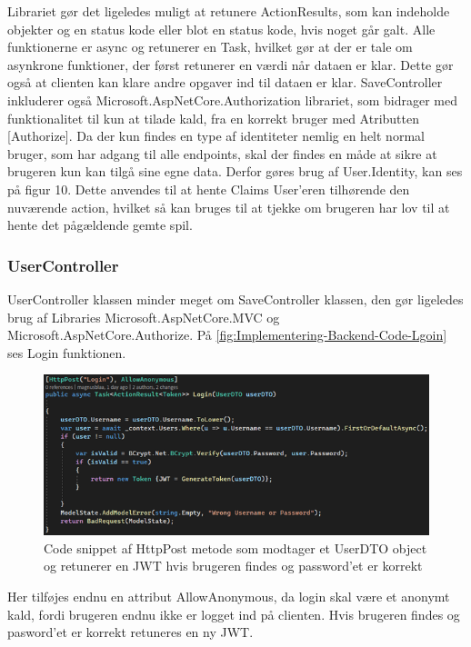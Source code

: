 Librariet gør det ligeledes muligt at retunere ActionResults, som kan indeholde objekter og en status kode eller blot en status kode, hvis noget går galt. Alle funktionerne er async og retunerer en Task, hvilket gør at der er tale om asynkrone funktioner, der først retunerer en værdi når dataen er klar. Dette gør også at clienten kan klare andre opgaver ind til dataen er klar.
SaveController inkluderer også Microsoft.AspNetCore.Authorization librariet, som bidrager med funktionalitet til kun at tilade kald, fra en korrekt bruger med Atributten [Authorize]. Da der kun findes en type af identiteter nemlig en helt normal bruger, som har adgang til alle endpoints, skal der findes en måde at sikre at brugeren kun kan tilgå sine egne data. Derfor gøres brug af User.Identity, kan ses på figur 10. Dette anvendes til at hente Claims User'eren tilhørende den nuværende action, hvilket så kan bruges til at tjekke om brugeren har lov til at hente det pågældende gemte spil.\\
    

\subsubsection{UserController}

UserController klassen minder meget om SaveController klassen, den gør ligeledes brug af Libraries Microsoft.AspNetCore.MVC og Microsoft.AspNetCore.Authorize. På \autoref{fig:Implementering-Backend-Code-Lgoin} ses Login funktionen.

\begin{figure}[H]
\centering
\includegraphics[width = \textwidth]{02-Body/Images/Backend_Code_Login.PNG}
\caption{Code snippet af HttpPost metode som modtager et UserDTO object og retunerer en JWT hvis brugeren findes og password’et er korrekt}
\label{fig:Implementering-Backend-Code-Lgoin}
\end{figure}

Her tilføjes endnu en attribut AllowAnonymous, da login skal være et anonymt kald, fordi brugeren endnu ikke er logget ind på clienten. Hvis brugeren findes og pasword'et er korrekt retuneres en ny JWT.\\

